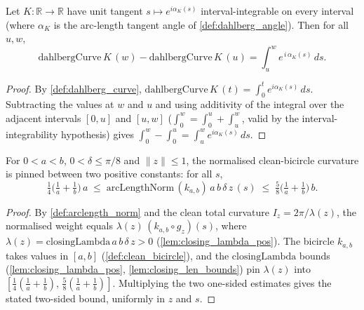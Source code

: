 \begin{lemma}

\leanok
[Chord of the reconstructed curve $=$ integral of its unit tangent]
  \label{lem:dahlberg_curve_sub}
  Let $K:\mathbb{R}\to\mathbb{R}$ have unit tangent $s\mapsto e^{i\alpha_K(s)}$
  interval-integrable on every interval (where $\alpha_K$ is the arc-length tangent
  angle of \cref{def:dahlberg_angle}). Then for all $u,w$,
  \[
    \mathrm{dahlbergCurve}\,K\,(w)-\mathrm{dahlbergCurve}\,K\,(u)
      =\int_u^w e^{\,i\,\alpha_K(s)}\,ds .
  \]
\end{lemma}
\begin{proof}
  \leanok
  By \cref{def:dahlberg_curve}, $\mathrm{dahlbergCurve}\,K\,(t)=\int_0^t
  e^{i\alpha_K(s)}\,ds$. Subtracting the values at $w$ and $u$ and using additivity
  of the integral over the adjacent intervals $[0,u]$ and $[u,w]$
  ($\int_0^w=\int_0^u+\int_u^w$, valid by the interval-integrability hypothesis)
  gives $\int_0^w-\int_0^u=\int_u^w e^{i\alpha_K(s)}\,ds$.
\end{proof}

\begin{lemma}

  \label{lem:clean_bicircle_arclength_norm_bounds}
  For $0<a<b$, $0<\delta\le\pi/8$ and $\|z\|\le1$, the normalised clean-bicircle
  curvature is pinned between two positive constants: for all $s$,
  \[
    \tfrac14\bigl(\tfrac1a+\tfrac1b\bigr)\,a
      \;\le\;\mathrm{arcLengthNorm}\,(k_{a,b})\,a\,b\,\delta\,z\,(s)
      \;\le\;\tfrac58\bigl(\tfrac1a+\tfrac1b\bigr)\,b .
  \]
\end{lemma}
\begin{proof}
  \leanok
  By \cref{def:arclength_norm} and the clean total curvature $I_z=2\pi/\lambda(z)$,
  the normalised weight equals $\lambda(z)\,(k_{a,b}\circ g_z)(s)$, where
  $\lambda(z)=\mathrm{closingLambda}\,a\,b\,\delta\,z>0$
  (\cref{lem:closing_lambda_pos}). The bicircle $k_{a,b}$ takes values in $[a,b]$
  (\cref{def:clean_bicircle}), and the $\mathrm{closingLambda}$ bounds
  (\cref{lem:closing_lambda_pos}, \cref{lem:closing_len_bounds}) pin $\lambda(z)$ into
  $[\tfrac14(\tfrac1a+\tfrac1b),\,\tfrac58(\tfrac1a+\tfrac1b)]$. Multiplying the two
  one-sided estimates gives the stated two-sided bound, uniformly in $z$ and $s$.
\end{proof}

